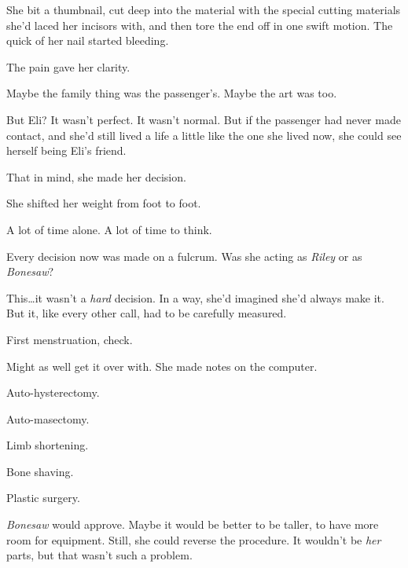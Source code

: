 She bit a thumbnail, cut deep into the material with the special cutting materials she'd laced her incisors with, and then tore the end off in one swift motion.  The quick of her nail started bleeding.



The pain gave her clarity.



Maybe the family thing was the passenger's.  Maybe the art was too.



But Eli?  It wasn't perfect.  It wasn't normal.  But if the passenger had never made contact, and she'd still lived a life a little like the one she lived now, she could see herself being Eli's friend.



That in mind, she made her decision.



\sectionbreak






She shifted her weight from foot to foot.



A lot of time alone.  A lot of time to think.



Every decision now was made on a fulcrum.  Was she acting as \emph{Riley} or as \emph{Bonesaw}?



This\ldots it wasn't a \emph{hard} decision.  In a way, she'd imagined she'd always make it.  But it, like every other call, had to be carefully measured.



First menstruation, check.



Might as well get it over with.  She made notes on the computer.



Auto-hysterectomy.



Auto-masectomy.



Limb shortening.



Bone shaving.



Plastic surgery.



\emph{Bonesaw} would approve.  Maybe it would be better to be taller, to have more room for equipment.  Still, she could reverse the procedure.  It wouldn't be \emph{her} parts, but that wasn't such a problem.



